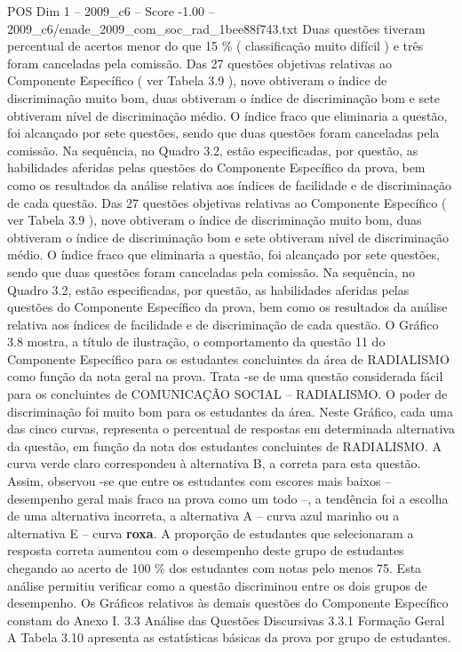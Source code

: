 \begin{textsample}{POS Dim 1 – 2009\_c6 – Score -1.00 – 2009\_c6/enade\_2009\_com\_soc\_rad\_1bee88f743.txt}
Duas questões tiveram percentual de acertos menor do que 15 \% ( classificação muito difícil ) e três foram canceladas pela comissão.
Das 27 questões objetivas relativas ao Componente Específico ( ver Tabela 3.9 ), nove obtiveram o índice de discriminação muito bom, duas obtiveram o índice de discriminação bom e sete obtiveram nível de discriminação médio.
O índice fraco que eliminaria a questão, foi alcançado por sete questões, sendo que duas questões foram canceladas pela comissão.
Na sequência, no Quadro 3.2, estão especificadas, por questão, as habilidades aferidas pelas questões do Componente Específico da prova, bem como os resultados da análise relativa aos índices de facilidade e de discriminação de cada questão.
Das 27 questões objetivas relativas ao Componente Específico ( ver Tabela 3.9 ), nove obtiveram o índice de discriminação muito bom, duas obtiveram o índice de discriminação bom e sete obtiveram nível de discriminação médio.
O índice fraco que eliminaria a questão, foi alcançado por sete questões, sendo que duas questões foram canceladas pela comissão.
Na sequência, no Quadro 3.2, estão especificadas, por questão, as habilidades aferidas pelas questões do Componente Específico da prova, bem como os resultados da análise relativa aos índices de facilidade e de discriminação de cada questão.
O Gráfico 3.8 mostra, a título de ilustração, o comportamento da questão 11 do Componente Específico para os estudantes concluintes da área de RADIALISMO como função da nota geral na prova.
Trata -se de uma questão considerada fácil para os concluintes de COMUNICAÇÃO SOCIAL – RADIALISMO.
O poder de discriminação foi muito bom para os estudantes da área.
Neste Gráfico, cada uma das cinco curvas, representa o percentual de respostas em determinada alternativa da questão, em função da nota dos estudantes concluintes de RADIALISMO.
A curva verde claro correspondeu à alternativa B, a correta para esta questão.
Assim, observou -se que entre os estudantes com escores mais baixos – desempenho geral mais fraco na prova como um todo –, a tendência foi a escolha de uma alternativa incorreta, a alternativa A – curva azul marinho ou a alternativa E – curva \textbf{roxa}.
A proporção de estudantes que selecionaram a resposta correta aumentou com o desempenho deste grupo de estudantes chegando ao acerto de 100 \% dos estudantes com notas pelo menos 75.
Esta análise permitiu verificar como a questão discriminou entre os dois grupos de desempenho.
Os Gráficos relativos às demais questões do Componente Específico constam do Anexo I. 3.3 Análise das Questões Discursivas 3.3.1 Formação Geral A Tabela 3.10 apresenta as estatísticas básicas da prova por grupo de estudantes.

\end{textsample}

